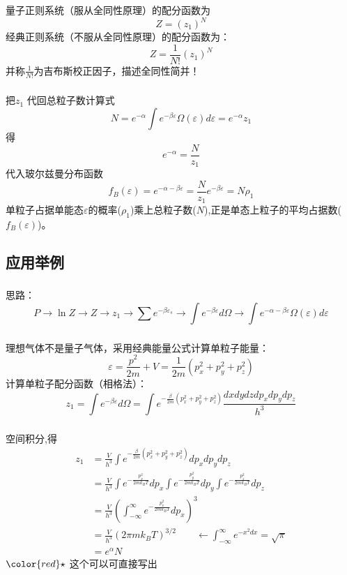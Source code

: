 \begin{frame}
  \frametitle{}
量子正则系统（服从全同性原理）的配分函数为
\[ Z = (z_1)^N \]
经典正则系统（不服从全同性原理）的配分函数为：
\[ \boxed{Z = \frac{1}{N!} (z_1)^N}  \]
并称$ \frac{1}{N!}  $为吉布斯校正因子，描述全同性简并！ 
\end{frame} 

\begin{frame}
  \frametitle{}
  把$z_1$ 代回总粒子数计算式
  \[ N = e^{-\alpha} \int e^{-\beta \varepsilon} \Omega(\varepsilon) d \varepsilon  = e^{-\alpha} z_1 \]
  得\[ e^{-\alpha} = \frac{N}{z_1}\]
  代入玻尔兹曼分布函数
  \[ f_B(\varepsilon) = e^{-\alpha -\beta \varepsilon} = \frac{N}{z_1} e^{ -\beta \varepsilon} = N \rho _1 \]
  单粒子占据单能态$\varepsilon$的概率($\rho _1$)乘上总粒子数($N$),正是单态上粒子的平均占据数($f_B(\varepsilon)$)。
\end{frame} 

\subsection{应用举例}

\begin{frame}
  \frametitle{}
  思路：
  \[ P \to \ln Z \to Z \to z_1 \to 
    \sum e^{-\beta \varepsilon _s } \to \int e^{-\beta \varepsilon} d \Omega \to \int e^{-\alpha -\beta \varepsilon} \Omega(\varepsilon) d \varepsilon \]
\end{frame} 

\begin{frame}
  \frametitle{}
  \解 理想气体不是量子气体，采用经典能量公式计算单粒子能量：
  \[ \varepsilon = \frac{p^2}{2m } + V = \frac{1}{2m} (p_x^2 +p_y^2 + p_z^2)\]
计算单粒子配分函数（相格法）：
$$ z_1 =\int e^{-\beta \varepsilon} d \Omega  = \int e^{- \frac{\beta}{2m} (p_x^2 +p_y^2 + p_z^2)} \frac{dxdydzdp_xdp_y dp_z}{h^3} $$ 
\end{frame} 

\begin{frame}
  \frametitle{}
空间积分,得
\[ 
  \begin{aligned}
    z_1 &=\frac{V}{h^3}\int e^{- \frac{\beta}{2m} (p_x^2 +p_y^2 + p_z^2)} dp_xdp_y dp_z  \\ 
&= \frac{V}{h^3}\int e^{- \frac{p_x^2}{2mk_BT}}dp_x \int e^{- \frac{p_y^2}{2mk_BT}}dp_y \int e^{- \frac{p_z^2}{2mk_BT}}dp_z  \\
&= \frac{V}{h^3}\left(\int_{-\infty}^\infty e^{- \frac{p_x^2}{2mk_BT}}dp_x\right)^3 \\
&= \frac{V}{h^3} (2\pi mk_BT)^{3/2}  \qquad \leftarrow \int_{-\infty}^\infty e^{-x^2 dx} = \sqrt{\pi} \\
&= e^\alpha N
  \end{aligned}
\]
${\color{red}\star}$ 这个可以可直接写出
\end{frame} 

